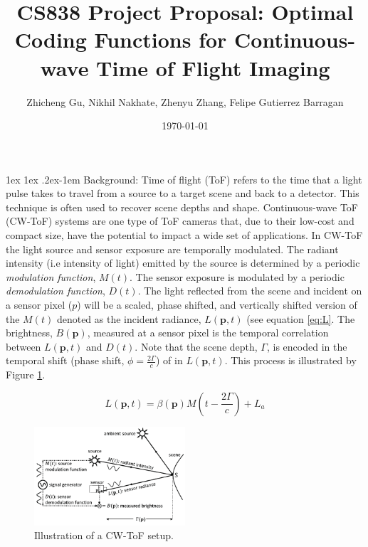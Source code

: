 \documentclass[12pt]{article}
\title{CS838 Project Proposal: Optimal Coding Functions for Continuous-wave Time of Flight Imaging}
\author{Zhicheng Gu, Nikhil Nakhate, Zhenyu Zhang, Felipe Gutierrez Barragan}
\date{\today}
\makeatletter
\def \p {\mathbf{p}}
\renewcommand{\paragraph}{%
  \@startsection{paragraph}{4}%
  {\z@}{1ex \@plus 1ex \@minus .2ex}{-1em}%
  {\normalfont\normalsize\bfseries}%
}
\makeatother
\begin{document}
\maketitle

\paragraph{Background:} Time of flight (ToF) refers to the time that a light pulse takes to travel from a source to a target scene and back to a detector. This technique is often used to recover scene depths and shape. Continuous-wave ToF (CW-ToF) systems are one type of ToF cameras that, due to their low-cost and compact size, have the potential to impact a wide set of applications. In CW-ToF the light source and sensor exposure are temporally modulated. The radiant intensity (i.e intensity of light) emitted by the source is determined by a periodic \textit{modulation function}, $M(t)$. The sensor exposure is modulated by a periodic \textit{demodulation function}, $D(t)$. The light reflected from the scene and incident on a sensor pixel ($p$) will be a scaled, phase shifted, and vertically shifted version of the $M(t)$ denoted as the incident radiance, $L(\p,t)$ (see equation \ref{eq:L}. The brightness, $B(\p)$, measured at a sensor pixel is the temporal correlation between $L(\p,t)$ and $D(t)$. Note that the scene depth, $\Gamma$, is encoded in the temporal shift (phase shift, $\phi = \frac{2\Gamma}{c}$) of in $L(\p,t)$. This process is illustrated by Figure \ref{fig:tofIllustration}.

\begin{equation} \label{eq:L}
    L(\p,t) = \beta(\p) M(t - \frac{2\Gamma}{c}) + L_a
\end{equation}

\begin{figure}[h]
\centerline{%
\includegraphics[width=0.5\textwidth]{"../Figures/tofIllustration"}%
}
\caption{Illustration of a CW-ToF setup.}
\label{fig:tofIllustration}
\end{figure}
\end{document}
